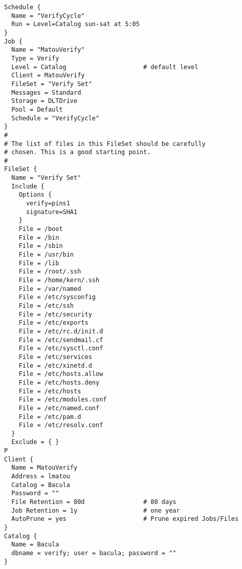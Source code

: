 \footnotesize
\begin{verbatim}
Schedule {
  Name = "VerifyCycle"
  Run = Level=Catalog sun-sat at 5:05
}
Job {
  Name = "MatouVerify"
  Type = Verify
  Level = Catalog                     # default level
  Client = MatouVerify
  FileSet = "Verify Set"
  Messages = Standard
  Storage = DLTDrive
  Pool = Default
  Schedule = "VerifyCycle"
}
#
# The list of files in this FileSet should be carefully
# chosen. This is a good starting point.
#
FileSet {
  Name = "Verify Set"
  Include {
    Options {
      verify=pins1
      signature=SHA1
    }
    File = /boot
    File = /bin
    File = /sbin
    File = /usr/bin
    File = /lib
    File = /root/.ssh
    File = /home/kern/.ssh
    File = /var/named
    File = /etc/sysconfig
    File = /etc/ssh
    File = /etc/security
    File = /etc/exports
    File = /etc/rc.d/init.d
    File = /etc/sendmail.cf
    File = /etc/sysctl.conf
    File = /etc/services
    File = /etc/xinetd.d
    File = /etc/hosts.allow
    File = /etc/hosts.deny
    File = /etc/hosts
    File = /etc/modules.conf
    File = /etc/named.conf
    File = /etc/pam.d
    File = /etc/resolv.conf
  }
  Exclude = { }
P
Client {
  Name = MatouVerify
  Address = lmatou
  Catalog = Bacula
  Password = ""
  File Retention = 80d                # 80 days
  Job Retention = 1y                  # one year
  AutoPrune = yes                     # Prune expired Jobs/Files
}
Catalog {
  Name = Bacula
  dbname = verify; user = bacula; password = ""
}
\end{verbatim}
\normalsize
